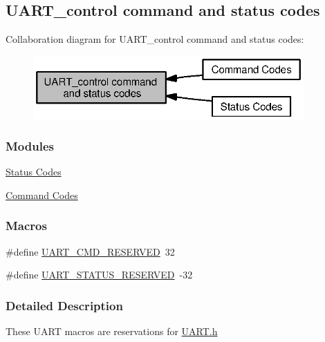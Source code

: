 \subsection{U\+A\+R\+T\+\_\+control command and status codes}
\label{group___u_a_r_t___c_o_n_t_r_o_l}
Collaboration diagram for U\+A\+R\+T\+\_\+control command and status codes\+:
\nopagebreak
\begin{figure}[H]
\begin{center}
\leavevmode
\includegraphics[width=293pt]{group___u_a_r_t___c_o_n_t_r_o_l}
\end{center}
\end{figure}
\subsubsection*{Modules}
\begin{DoxyCompactItemize}
\item 
\hyperlink{group___u_a_r_t___s_t_a_t_u_s}{Status Codes}
\item 
\hyperlink{group___u_a_r_t___c_m_d}{Command Codes}
\end{DoxyCompactItemize}
\subsubsection*{Macros}
\begin{DoxyCompactItemize}
\item 
\#define \hyperlink{group___u_a_r_t___c_o_n_t_r_o_l_ga0f5a809e0884da33fef102236eb51644}{U\+A\+R\+T\+\_\+\+C\+M\+D\+\_\+\+R\+E\+S\+E\+R\+V\+E\+D}~32
\item 
\#define \hyperlink{group___u_a_r_t___c_o_n_t_r_o_l_ga8f35027907fbab6a9ee302d2ee52a879}{U\+A\+R\+T\+\_\+\+S\+T\+A\+T\+U\+S\+\_\+\+R\+E\+S\+E\+R\+V\+E\+D}~-\/32
\end{DoxyCompactItemize}


\subsubsection{Detailed Description}
These U\+A\+R\+T macros are reservations for \hyperlink{_u_a_r_t_8h}{U\+A\+R\+T.\+h} 

